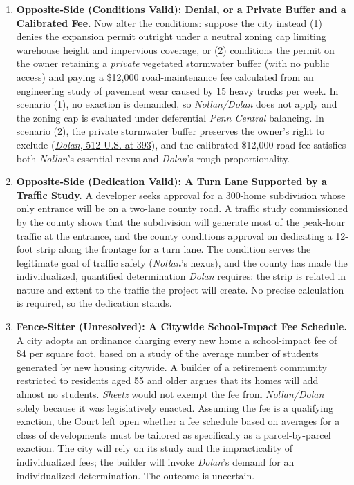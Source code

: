 \documentclass[12pt]{article}
\begin{document}
\begin{enumerate}
\item \textbf{Opposite-Side (Conditions Valid): Denial, or a Private Buffer and a Calibrated Fee.} Now alter the conditions: suppose the city instead (1) denies the expansion permit outright under a neutral zoning cap limiting warehouse height and impervious coverage, or (2) conditions the permit on the owner retaining a \emph{private} vegetated stormwater buffer (with no public access) and paying a \$12,000 road-maintenance fee calculated from an engineering study of pavement wear caused by 15 heavy trucks per week. In scenario (1), no exaction is demanded, so \emph{Nollan/Dolan} does not apply and the zoning cap is evaluated under deferential \emph{Penn Central} balancing. In scenario (2), the private stormwater buffer preserves the owner's right to exclude (\href{https://supreme.justia.com/cases/federal/us/512/374/}{\emph{Dolan}, 512 U.S. at 393}), and the calibrated \$12,000 road fee satisfies both \emph{Nollan}'s essential nexus and \emph{Dolan}'s rough proportionality.

\item \textbf{Opposite-Side (Dedication Valid): A Turn Lane Supported by a Traffic Study.} A developer seeks approval for a 300-home subdivision whose only entrance will be on a two-lane county road. A traffic study commissioned by the county shows that the subdivision will generate most of the peak-hour traffic at the entrance, and the county conditions approval on dedicating a 12-foot strip along the frontage for a turn lane. The condition serves the legitimate goal of traffic safety (\textit{Nollan}'s nexus), and the county has made the individualized, quantified determination \textit{Dolan} requires: the strip is related in nature and extent to the traffic the project will create. No precise calculation is required, so the dedication stands.

\item \textbf{Fence-Sitter (Unresolved): A Citywide School-Impact Fee Schedule.} A city adopts an ordinance charging every new home a school-impact fee of \$4 per square foot, based on a study of the average number of students generated by new housing citywide. A builder of a retirement community restricted to residents aged 55 and older argues that its homes will add almost no students. \textit{Sheetz} would not exempt the fee from \textit{Nollan/Dolan} solely because it was legislatively enacted. Assuming the fee is a qualifying exaction, the Court left open whether a fee schedule based on averages for a class of developments must be tailored as specifically as a parcel-by-parcel exaction. The city will rely on its study and the impracticality of individualized fees; the builder will invoke \textit{Dolan}'s demand for an individualized determination. The outcome is uncertain.

\end{enumerate}
\end{document}
